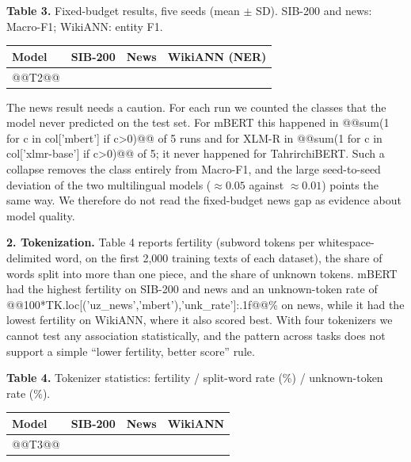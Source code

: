 \documentclass[11pt]{book}
\begin{document}
\begin{center}
\textbf{Table 3.} Fixed-budget results, five seeds (mean $\pm$ SD). SIB-200 and news: Macro-F1; WikiANN: entity F1.\\[2pt]
\begin{tabular}{lccc}
\hline
Model & SIB-200 & News & WikiANN (NER) \\
\hline
@@T2@@
\hline
\end{tabular}
\end{center}

The news result needs a caution. For each run we counted the classes that the model never predicted on the test set. For mBERT this happened in @@sum(1 for c in col['mbert'] if c>0)@@ of 5 runs and for XLM-R in @@sum(1 for c in col['xlmr-base'] if c>0)@@ of 5; it never happened for TahrirchiBERT. Such a collapse removes the class entirely from Macro-F1, and the large seed-to-seed deviation of the two multilingual models ($\approx0.05$ against $\approx0.01$) points the same way. We therefore do not read the fixed-budget news gap as evidence about model quality.

\textbf{2. Tokenization.} Table 4 reports fertility (subword tokens per whitespace-delimited word, on the first 2,000 training texts of each dataset), the share of words split into more than one piece, and the share of unknown tokens. mBERT had the highest fertility on SIB-200 and news and an unknown-token rate of @@100*TK.loc[('uz_news','mbert'),'unk_rate']:.1f@@\% on news, while it had the lowest fertility on WikiANN, where it also scored best. With four tokenizers we cannot test any association statistically, and the pattern across tasks does not support a simple ``lower fertility, better score'' rule.

\begin{center}
\textbf{Table 4.} Tokenizer statistics: fertility / split-word rate (\%) / unknown-token rate (\%).\\[2pt]
\begin{tabular}{lccc}
\hline
Model & SIB-200 & News & WikiANN \\
\hline
@@T3@@
\hline
\end{tabular}
\end{center}
\end{document}
